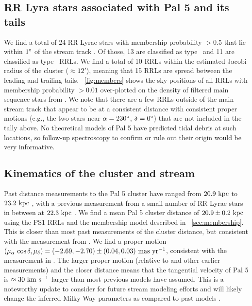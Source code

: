 \documentclass[twocolumn]{aastex63}
\newcommand{\sa}[1]{{\color{teal} SP: #1}}
\begin{document}
\subsection{RR Lyra stars associated with Pal 5 and its tails}
We find a total of 24 RR Lyrae stars with membership probability $> 0.5$ that lie within $1\mbox{$^\circ$}$ of the stream track \citep[again using the track from][]{Bonaca:2019}.
Of those, 13 are classified as type \typeab\ and 11 are classified as type \typec\ RRLs.
We find a total of 10 RRLs within the estimated Jacobi radius of the cluster ($\approx 12'$), meaning that 15 RRLs are spread between the leading and trailing tails.
\figurename~\ref{fig:members} shows the sky positions of all RRLs with membership probability $>0.01$ over-plotted on the density of filtered main sequence stars from \citet{Bonaca:2019}.
We note that there are a few RRLs outside of the main stream track that appear to be at a consistent distance with consistent proper motions (e.g., the two stars near $\alpha = 230\mbox{$^\circ$}$, $\delta = 0\mbox{$^\circ$}$) that are not included in the tally above.
No theoretical models of Pal 5 have predicted tidal debris at such locations, so follow-up spectroscopy to confirm or rule out their origin would be very informative.


\subsection{Kinematics of the cluster and stream}

Past distance measurements to the Pal 5 cluster have ranged from $20.9~\mathrm{kpc}$ \citep{Dotter:2011} to $23.2~\mathrm{kpc}$ \citep{Harris:1996}, with a previous measurement from a small number of RR Lyrae stars in between at $22.3~\mathrm{kpc}$ \citep{Vivas:2006}. %
We find a mean Pal 5 cluster distance of $20.9 \pm 0.2~\mathrm{kpc}$ using the PS1 RRLs and the membership model described in \sectionname~\ref{sec:membership}.
This is closer than most past measurements of the cluster distance, but consistent with the measurement from \citet{Dotter:2011}.
We find a proper motion $(\mu_\alpha\,\cos\delta, \mu_\delta) = (-2.69, -2.70) \pm (0.04, 0.03)~\mathrm{mas}~\mathrm{yr}^{-1}$, consistent with the measurement in \citet{Vasiliev:2019}. %
The larger proper motion (relative to \citealt{Fritz:2015} and other earlier measurements) and the closer distance means that the tangential velocity of Pal 5 is $\approx 30~\mathrm{km}~\mathrm{s}^{-1}$ larger than most previous models have assumed.
This is a noteworthy update to consider for future stream modeling efforts and will likely change the inferred Milky Way parameters as compared to past models \citep[e.g.,][]{Kuepper:2015, Bovy:2016}.
\end{document}
